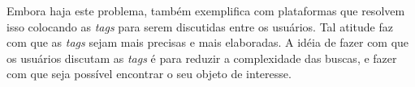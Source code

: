 \documentclass[
	12pt,				%
	openright,			%
	twoside,			%
	a4paper,			%
	Times,
	brazil,				%
	]{abntex2}
\begin{document}
Embora haja este problema,  também exemplifica com plataformas que resolvem isso colocando as \textit{tags} para serem discutidas entre os usuários. Tal atitude faz com que as \textit{tags} sejam mais precisas e mais elaboradas. A idéia de fazer com que os usuários discutam as \textit{tags} é para reduzir a complexidade das buscas, e fazer com que seja possível encontrar o seu objeto de interesse.\cite{tag-2}


% 




\postextual





\end{document}

